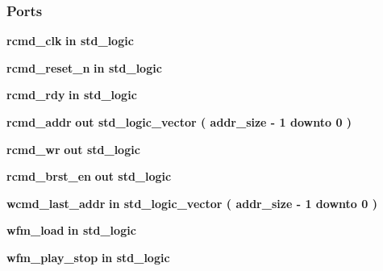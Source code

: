 \subsubsection*{Ports}
 \begin{DoxyCompactItemize}
\item 
{\bf rcmd\+\_\+clk}  {\bfseries {\bfseries \textcolor{keywordflow}{in}\textcolor{vhdlchar}{ }}} {\bfseries \textcolor{comment}{std\+\_\+logic}\textcolor{vhdlchar}{ }} 
\item 
{\bf rcmd\+\_\+reset\+\_\+n}  {\bfseries {\bfseries \textcolor{keywordflow}{in}\textcolor{vhdlchar}{ }}} {\bfseries \textcolor{comment}{std\+\_\+logic}\textcolor{vhdlchar}{ }} 
\item 
{\bf rcmd\+\_\+rdy}  {\bfseries {\bfseries \textcolor{keywordflow}{in}\textcolor{vhdlchar}{ }}} {\bfseries \textcolor{comment}{std\+\_\+logic}\textcolor{vhdlchar}{ }} 
\item 
{\bf rcmd\+\_\+addr}  {\bfseries {\bfseries \textcolor{keywordflow}{out}\textcolor{vhdlchar}{ }}} {\bfseries \textcolor{comment}{std\+\_\+logic\+\_\+vector}\textcolor{vhdlchar}{ }\textcolor{vhdlchar}{(}\textcolor{vhdlchar}{ }\textcolor{vhdlchar}{ }\textcolor{vhdlchar}{ }\textcolor{vhdlchar}{ }{\bfseries {\bf addr\+\_\+size}} \textcolor{vhdlchar}{-\/}\textcolor{vhdlchar}{ } \textcolor{vhdldigit}{1} \textcolor{vhdlchar}{ }\textcolor{keywordflow}{downto}\textcolor{vhdlchar}{ }\textcolor{vhdlchar}{ } \textcolor{vhdldigit}{0} \textcolor{vhdlchar}{ }\textcolor{vhdlchar}{)}\textcolor{vhdlchar}{ }} 
\item 
{\bf rcmd\+\_\+wr}  {\bfseries {\bfseries \textcolor{keywordflow}{out}\textcolor{vhdlchar}{ }}} {\bfseries \textcolor{comment}{std\+\_\+logic}\textcolor{vhdlchar}{ }} 
\item 
{\bf rcmd\+\_\+brst\+\_\+en}  {\bfseries {\bfseries \textcolor{keywordflow}{out}\textcolor{vhdlchar}{ }}} {\bfseries \textcolor{comment}{std\+\_\+logic}\textcolor{vhdlchar}{ }} 
\item 
{\bf wcmd\+\_\+last\+\_\+addr}  {\bfseries {\bfseries \textcolor{keywordflow}{in}\textcolor{vhdlchar}{ }}} {\bfseries \textcolor{comment}{std\+\_\+logic\+\_\+vector}\textcolor{vhdlchar}{ }\textcolor{vhdlchar}{(}\textcolor{vhdlchar}{ }\textcolor{vhdlchar}{ }\textcolor{vhdlchar}{ }\textcolor{vhdlchar}{ }{\bfseries {\bf addr\+\_\+size}} \textcolor{vhdlchar}{-\/}\textcolor{vhdlchar}{ } \textcolor{vhdldigit}{1} \textcolor{vhdlchar}{ }\textcolor{keywordflow}{downto}\textcolor{vhdlchar}{ }\textcolor{vhdlchar}{ } \textcolor{vhdldigit}{0} \textcolor{vhdlchar}{ }\textcolor{vhdlchar}{)}\textcolor{vhdlchar}{ }} 
\item 
{\bf wfm\+\_\+load}  {\bfseries {\bfseries \textcolor{keywordflow}{in}\textcolor{vhdlchar}{ }}} {\bfseries \textcolor{comment}{std\+\_\+logic}\textcolor{vhdlchar}{ }} 
\item 
{\bf wfm\+\_\+play\+\_\+stop}  {\bfseries {\bfseries \textcolor{keywordflow}{in}\textcolor{vhdlchar}{ }}} {\bfseries \textcolor{comment}{std\+\_\+logic}\textcolor{vhdlchar}{ }} 
\end{DoxyCompactItemize}


